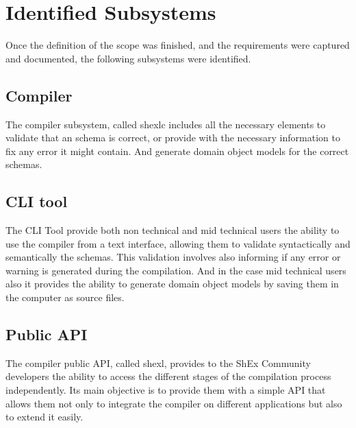 \section{Identified Subsystems}

Once the definition of the scope was finished, and the requirements were captured and documented, the following subsystems were identified.

\subsection{Compiler}
The compiler subsystem, called shexlc includes all the necessary elements to validate that
an schema is correct, or provide with the necessary information to fix any error it might
contain. And generate domain object models for the correct schemas. 

\subsection{CLI tool}
The CLI Tool provide both non technical and mid technical users the ability to use the
compiler from a text interface, allowing them to validate syntactically and semantically the
schemas. This validation involves also informing if any error or warning is generated during
the compilation. And in the case mid technical users also it provides the ability to generate
domain object models by saving them in the computer as source files. 

\subsection{Public API}
The compiler public API, called shexl, provides to the ShEx Community developers the
ability to access the different stages of the compilation process independently. Its main
objective is to provide them with a simple API that allows them not only to integrate the
compiler on different applications but also to extend it easily. 